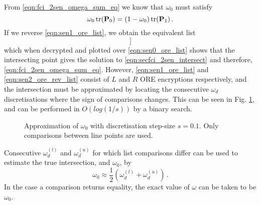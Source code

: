 \documentclass[letterpaper, 10 pt, conference]{ieeeconf}  %
\begin{document}
From \eqref{eqn:fci_2sen_omega_sum_eq} we know that $\omega_0$ must satisfy
\begin{equation}
   \omega_0 \operatorname{tr}({{\mathbf{P}}}_0) = (1-\omega_0)\operatorname{tr}({{\mathbf{P}}}_1)\,. \label{eqn:secfci_2sen_intersect}
\end{equation}
If we reverse \eqref{eqn:sen1_ore_list}, we obtain the equivalent list
\begin{equation}
   [\mathcal{E}^R_{ORE}((1-\omega_d)\tr(\mP_1)),\ \omega_d \in [0,s,\dots,1-s,1]] \label{eqn:sen2_ore_rev_list}
\end{equation}
which when decrypted and plotted over \eqref{eqn:sen0_ore_list} shows that the intersecting point gives the solution to \eqref{eqn:secfci_2sen_intersect} and therefore, \eqref{eqn:fci_2sen_omega_sum_eq}. However, \eqref{eqn:sen1_ore_list} and \eqref{eqn:sen2_ore_rev_list} consist of $L$ and $R$ ORE encryptions respectively, and the intersection must be approximated by locating the consecutive $\omega_d$ discretisations where the sign of comparisons changes. This can be seen in Fig. \ref{fig:2_sensor_sol}, and can be performed in $O(log(1/s))$ by a binary search.
\begin{figure}[tb]
   \vspace{-5pt}
   \begin{center}
      
   \end{center}
   \vspace{-10pt}
   \caption{Approximation of $\omega_0$ with discretisation step-size $s=0.1$. Only comparisons between line points are used.}
   \label{fig:2_sensor_sol}
\end{figure}
Consecutive $\omega_d^{(l)}$ and $\omega_d^{(u)}$ for which list comparisons differ can be used to estimate the true intersection, and $\omega_0$, by
\begin{equation}
   \omega_0 \approx \frac{1}{2}(\omega_d^{(l)} + \omega_d^{(u)})\,. \label{eqn:secfci_2sen_omega}
\end{equation}
In the case a comparison returns equality, the exact value of $\omega$ can be taken to be $\omega_0$.

\end{document}
